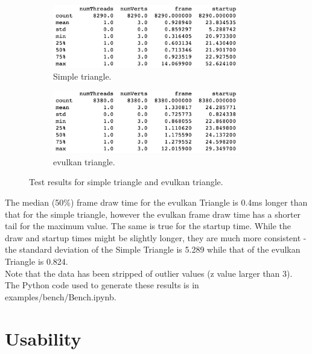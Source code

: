 \documentclass[12pt]{report}
\theoremstyle{definition}
\begin{document}
        \begin{figure}[h]
          \begin{subfigure}[b]{0.5\textwidth}
            \centering
            \includegraphics[width=0.9\textwidth]{images/simple_describe.png}
            \caption{Simple triangle.}
          \end{subfigure}
          \begin{subfigure}[b]{0.5\textwidth}
            \centering
            \includegraphics[width=0.9\textwidth]{images/evk_describe.png}
            \caption{evulkan triangle.}
          \end{subfigure}
          \caption{Test results for simple triangle and evulkan triangle.}
          \label{fig:test_describe}                        
        \end{figure}

        The median (50\%) frame draw time for the evulkan Triangle is 0.4ms
        longer than that for the simple triangle, however the evulkan frame
        draw time has a shorter tail for the maximum value.  The same is true
        for the startup time. While the draw and startup times might be
        slightly longer, they are much more consistent - the standard
        deviation of the Simple Triangle is 5.289 while that of the evulkan
        Triangle is 0.824. \\

        Note that the data has been stripped of outlier values (z value larger than 3).
        The Python code used to generate these results is in examples/bench/Bench.ipynb.

    \section{Usability}
\end{document}

